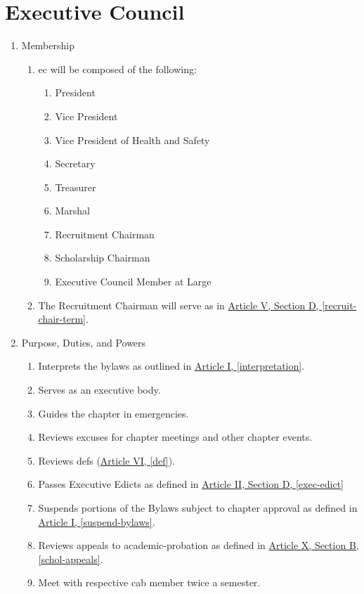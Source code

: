 \section{Executive Council}
	\begin{enumerate}
		\item Membership
			\begin{enumerate}
				\item \Gls{ec} will be composed of the following:
					\begin{enumerate}
						\item President
						\item Vice President
						\item Vice President of Health and Safety
						\item Secretary
						\item Treasurer
						\item Marshal
						\item Recruitment Chairman
                        \item Scholarship Chairman
						\item Executive Council Member at Large
					\end{enumerate}
				\item The Recruitment Chairman will serve as in \hyperref[recruit-chair-term]{Article V, Section D, \autoref*{recruit-chair-term}}.

			\end{enumerate}

		\item Purpose, Duties, and Powers
			\begin{enumerate}
				\item Interprets the bylaws as outlined in \hyperref[interpretation]{Article I, \autoref*{interpretation}}. 
				\item Serves as an executive body.
				\item Guides the chapter in emergencies.
				\item Reviews excuses for chapter meetings and other chapter events.
				\item Reviews \glspl{def} (\hyperref[def]{Article VI, \autoref*{def}}). 
				\item Passes Executive Edicts as defined in \hyperref[exec-edict]{Article II, Section D, \autoref*{exec-edict}}
				\item Suspends portions of the Bylaws subject to chapter approval as defined in \hyperref[suspend-bylaws]{Article I, \autoref*{suspend-bylaws}}.
				\item Reviews appeals to \gls{academic-probation} as defined in \hyperref[schol-appeals]{Article X, Section B, \autoref*{schol-appeals}}.
				\item Meet with respective \gls{cab} member twice a semester.
			\end{enumerate}


\end{enumerate}
